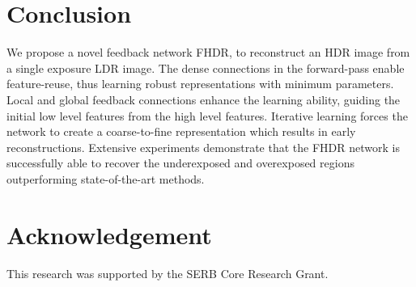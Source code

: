 \documentclass[conference]{IEEEtran}
\begin{document}
\section{Conclusion}
We propose a novel feedback network FHDR, to reconstruct an HDR image from a single exposure LDR image. The dense connections in the forward-pass enable feature-reuse, thus learning robust representations with minimum parameters. Local and global feedback connections enhance the learning ability, guiding the initial low level features from the high level features.
Iterative learning forces the network to create a coarse-to-fine representation which results in early reconstructions. 
Extensive experiments demonstrate that the FHDR network is successfully able to recover the underexposed and overexposed regions outperforming state-of-the-art methods.

\section{Acknowledgement}
This research was supported by the SERB Core Research Grant.

 

\end{document}
